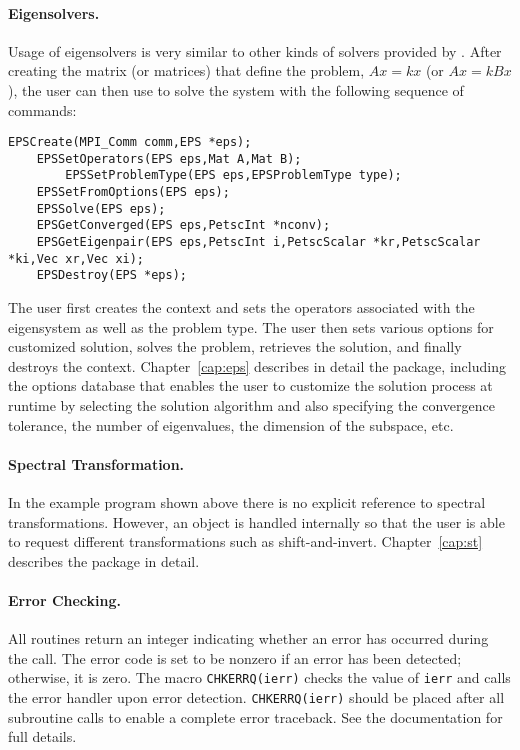 \paragraph{Eigensolvers.}

Usage of eigensolvers is very similar to other kinds of solvers provided by \petsc. After creating the matrix (or matrices) that define the problem, $Ax = kx$ (or $Ax=kBx$), the user can then use  to solve the system with the following sequence of commands:
  
  
 
	\begin{Verbatim}[fontsize=\small,numbers=none]
	EPSCreate(MPI_Comm comm,EPS *eps);
	EPSSetOperators(EPS eps,Mat A,Mat B);
        EPSSetProblemType(EPS eps,EPSProblemType type);
	EPSSetFromOptions(EPS eps);
	EPSSolve(EPS eps);
	EPSGetConverged(EPS eps,PetscInt *nconv);
	EPSGetEigenpair(EPS eps,PetscInt i,PetscScalar *kr,PetscScalar *ki,Vec xr,Vec xi);
	EPSDestroy(EPS *eps);
	\end{Verbatim}
The user first creates the  context and sets the operators associated with the eigensystem as well as the problem type. The user then sets various options for customized solution, solves the problem, retrieves the solution, and finally destroys the  context. Chapter~\ref{cap:eps} describes in detail the  package, including
the options database that enables the user to customize the solution process at runtime by selecting the solution algorithm and also specifying the convergence tolerance, the number of eigenvalues, the dimension of the subspace, etc.

\paragraph{Spectral Transformation.}

In the example program shown above there is no explicit reference to spectral transformations. However, an  object is handled internally so that the user is able to request different transformations such as shift-and-invert. Chapter~\ref{cap:st} describes the  package in detail.

\paragraph{Error Checking.}

	All \slepc routines return an integer indicating whether an error has occurred during the call. The error code is set to be nonzero if an error has been detected; otherwise, it is zero. The \petsc macro \Verb!CHKERRQ(ierr)! checks the value of \Verb!ierr! and calls the \petsc error handler upon error detection. \Verb!CHKERRQ(ierr)! should be placed after all subroutine calls to enable a complete error traceback. See the \petsc documentation for full details.

